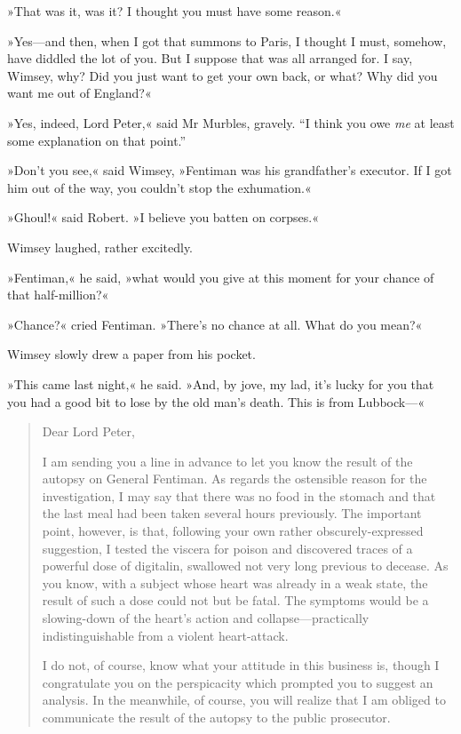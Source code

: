 »That was it, was it? I thought you must have some reason.«

»Yes\allowbreak---\allowbreak and then, when I got that summons to Paris, I thought I must, somehow, have diddled the lot of you. But I suppose that was all arranged for. I say, Wimsey, why? Did you just want to get your own back, or what? Why did you want me out of England?«

»Yes, indeed, Lord Peter,« said Mr Murbles, gravely. \enquote{I think you owe \textit{me} at least some explanation on that point.}

»Don't you see,« said Wimsey, »Fentiman was his grandfather's executor. If I got him out of the way, you couldn't stop the exhumation.«

»Ghoul!« said Robert. »I believe you batten on corpses.«

Wimsey laughed, rather excitedly.

»Fentiman,« he said, »what would you give at this moment for your chance of that half-million?«

»Chance?« cried Fentiman. »There's no chance at all. What do you mean?«

Wimsey slowly drew a paper from his pocket.

»This came last night,« he said. »And, by jove, my lad, it's lucky for you that you had a good bit to lose by the old man's death. This is from Lubbock---«

\begin{quotation}
\noindent Dear Lord Peter,

\indent I am sending you a line in advance to let you know the result of the autopsy on General Fentiman. As regards the ostensible reason for the investigation, I may say that there was no food in the stomach and that the last meal had been taken several hours previously. The important point, however, is that, following your own rather obscurely-expressed suggestion, I tested the viscera for poison and discovered traces of a powerful dose of digitalin, swallowed not very long previous to decease. As you know, with a subject whose heart was already in a weak state, the result of such a dose could not but be fatal. The symptoms would be a slowing-down of the heart's action and collapse\allowbreak---\allowbreak practically indistinguishable from a violent heart-attack.

I do not, of course, know what your attitude in this business is, though I congratulate you on the perspicacity which prompted you to suggest an analysis. In the meanwhile, of course, you will realize that I am obliged to communicate the result of the autopsy to the public prosecutor.
\end{quotation}

